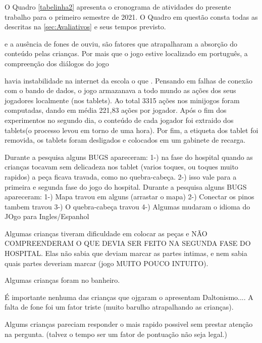 O Quadro \ref{tabelinha2} apresenta o cronograma de atividades do presente trabalho para o primeiro semestre de 2021. O Quadro em questão consta todas as descritas na \autoref{sec:Avaliativos} e seus tempos previsto. 


e a ausência de fones de ouviu, são fatores que atrapalharam a absorção do conteúdo pelas crianças. Por mais que o jogo estive localizado em português, a compreenção dos diálogos do jogo 






havia instabilidade na internet da escola o que . Pensando em falhas de conexão com o bando de dados, o jogo armazanava a todo mundo as ações dos seus jogadores localmente (nos tablets). Ao total 3315 ações nos minijogos foram computadas, dando em média 221,83 ações por jogador. Após o fim dos experimentos no segundo dia, o conteúdo de cada jogador foi extraido dos tablets(o processo levou em torno de uma hora). Por fim, a etiqueta dos tablet foi removida, os tablets foram desligados e colocados em um gabinete de recarga.

Durante a pesquisa alguns BUGS apareceram:
1-) na fase do hospital quando as crianças tocavam sem delicadeza nos tablet (varios toques, ou toques muito rapidos) a peça ficava travada, como no quebra-cabeça. 
2-) isso vale para a primeira e segunda fase do jogo do hospital.
Durante a pesquisa alguns BUGS apareceram: 
1-) Mapa travou em alguns (arrastar o mapa)
2-) Conectar os pinos tambem travou
3-) O quebra-cabeça travou
4-) Algumas mudaram o idioma do JOgo para Ingles/Espanhol

Algumas crianças tiveram dificuldade em colocar as peças e NÃO COMPREENDERAM O QUE DEVIA SER FEITO NA SEGUNDA FASE DO HOSPITAL. Elas não sabia que deviam marcar as partes intimas, e nem sabia quais partes deveriam marcar (jogo MUITO POUCO INTUITO).

Algumas crianças foram no banheiro.

É importante nenhuma das crianças que ojgaram o apresentam Daltonismo....  A falta de fone foi um fator triste (muito barulho atrapalhando as crianças).

Algums crianças pareciam responder o mais rapido possivel sem prestar atenção na pergunta. (talvez o tempo ser um fator de pontuação não seja legal.) 
